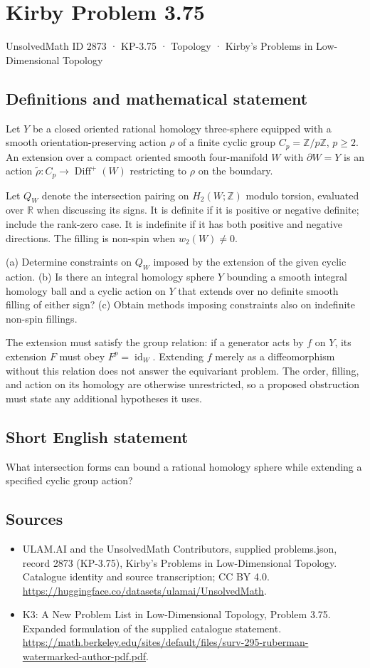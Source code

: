 \documentclass[11pt,a4paper]{article}
\begin{document}
\section*{Kirby Problem 3.75}\label{2873}
{\small UnsolvedMath ID 2873 · KP-3.75 · Topology · Kirby's Problems in Low-Dimensional Topology}
\subsection{Definitions and mathematical statement}
Let $Y$ be a closed oriented rational homology three-sphere equipped with a smooth orientation-preserving action $\rho$ of a finite cyclic group $C_p=\mathbb Z/p\mathbb Z$, $p\ge2$. An extension over a compact oriented smooth four-manifold $W$ with $\partial W=Y$ is an action $\widetilde\rho:C_p\to\operatorname{Diff}^+(W)$ restricting to $\rho$ on the boundary.

Let $Q_W$ denote the intersection pairing on $H_2(W;\mathbb Z)$ modulo torsion, evaluated over $\mathbb R$ when discussing its signs. It is definite if it is positive or negative definite; include the rank-zero case. It is indefinite if it has both positive and negative directions. The filling is non-spin when $w_2(W)\ne0$.

(a) Determine constraints on $Q_W$ imposed by the extension of the given cyclic action. (b) Is there an integral homology sphere $Y$ bounding a smooth integral homology ball and a cyclic action on $Y$ that extends over no definite smooth filling of either sign? (c) Obtain methods imposing constraints also on indefinite non-spin fillings.

The extension must satisfy the group relation: if a generator acts by $f$ on $Y$, its extension $F$ must obey $F^p=\operatorname{id}_W$. Extending $f$ merely as a diffeomorphism without this relation does not answer the equivariant problem. The order, filling, and action on its homology are otherwise unrestricted, so a proposed obstruction must state any additional hypotheses it uses.
\subsection{Short English statement}
What intersection forms can bound a rational homology sphere while extending a specified cyclic group action?
\subsection{Sources}
\begin{itemize}
\item[S1] ULAM.AI and the UnsolvedMath Contributors, supplied problems.json, record 2873 (KP-3.75), Kirby's Problems in Low-Dimensional Topology. Catalogue identity and source transcription; CC BY 4.0.
\url{https://huggingface.co/datasets/ulamai/UnsolvedMath}.
\item[S2] K3: A New Problem List in Low-Dimensional Topology, Problem 3.75. Expanded formulation of the supplied catalogue statement.
\url{https://math.berkeley.edu/sites/default/files/surv-295-ruberman-watermarked-author-pdf.pdf}.
\end{itemize}
\end{document}
